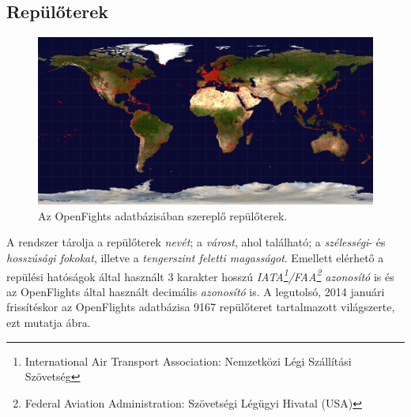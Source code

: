     \subsection{Repülőterek}
    \begin{figure}[!ht]
      \centering
      \includegraphics[width=150mm,keepaspectratio=true]{./figures/airports-2048.png}

      \caption{Az OpenFights adatbázisában szereplő repülőterek.}
      \label{fig:figure_repterek}
    \end{figure}

    A rendszer tárolja a repülőterek \textit{nevét}; a \textit{várost}, ahol található; a \textit{szélességi}- és \textit{hosszúsági fokokat}, illetve a \textit{tengerszint feletti magasságot}. Emellett elérhető a repülési hatóságok által használt 3 karakter hosszú \textit{IATA\footnote{International Air Transport Association: Nemzetközi Légi Szállítási Szövetség}/FAA\footnote{Federal Aviation Administration: Szövetségi Légügyi Hivatal (USA)} azonosító} is és az OpenFlights által használt decimális \textit{azonosító} is. A legutolsó, 2014 januári frissítéskor az OpenFlights adatbázisa 9167 repülőteret tartalmazott világszerte, ezt mutatja  ábra.

